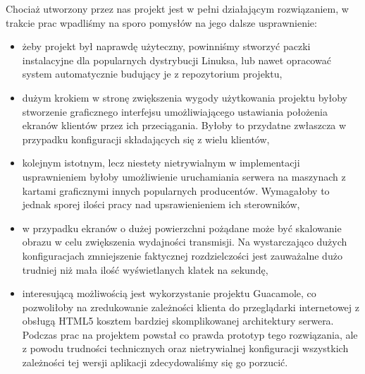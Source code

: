     Chociaż utworzony przez nas projekt jest w pełni działającym rozwiązaniem, w trakcie prac wpadliśmy na sporo pomysłów na jego dalsze usprawnienie:

    \begin{itemize}

      \item żeby projekt był naprawdę użyteczny, powinniśmy stworzyć paczki instalacyjne dla popularnych dystrybucji Linuksa, lub nawet opracować system automatycznie budujący je z repozytorium projektu,

      \item dużym krokiem w stronę zwiększenia wygody użytkowania projektu byłoby stworzenie graficznego interfejsu umożliwiającego ustawiania położenia ekranów klientów przez ich przeciągania. Byłoby to przydatne zwłaszcza w przypadku konfiguracji składających się z wielu klientów,

      \item kolejnym istotnym, lecz niestety nietrywialnym w implementacji usprawnieniem byłoby umożliwienie uruchamiania serwera na maszynach z kartami graficznymi innych popularnych producentów. Wymagałoby to jednak sporej ilości pracy nad upsrawienieniem ich sterowników,

      \item w przypadku ekranów o dużej powierzchni pożądane może być skalowanie obrazu w celu zwiększenia wydajności transmisji. Na wystarczająco dużych konfiguracjach zmniejszenie faktycznej rozdzielczości jest zauważalne dużo trudniej niż mała ilość wyświetlanych klatek na sekundę,

      \item interesującą możliwością jest wykorzystanie projektu Guacamole, co pozwoliłoby na zredukowanie zależności klienta do przeglądarki internetowej z obsługą HTML5 kosztem bardziej skomplikowanej architektury serwera. Podczas prac na projektem powstał co prawda prototyp tego rozwiązania, ale z powodu trudności technicznych oraz nietrywialnej konfiguracji wszystkich zależności tej wersji aplikacji zdecydowaliśmy się go porzucić.

    \end{itemize}

    \vfill

